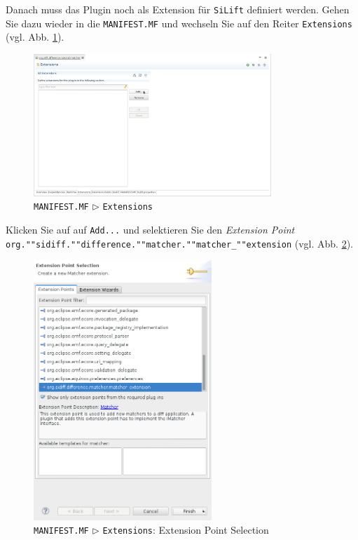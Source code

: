 Danach muss das Plugin noch als Extension für \texttt{SiLift} definiert werden.
Gehen Sie dazu wieder in die \texttt{MANIFEST.MF} und wechseln Sie auf den Reiter \texttt{Extensions} (vgl. Abb. \ref{silift-plugin_matcher_manifest_extensions}).

\begin{figure}[H]
\centering
\includegraphics[width=0.8\textwidth]{matching/graphics/silift-plugin_matcher_manifest_extensions.png}
\caption{\texttt{MANIFEST.MF} $\triangleright$ \texttt{Extensions}}
\label{silift-plugin_matcher_manifest_extensions}
\end{figure}

Klicken Sie auf auf \texttt{Add...} und selektieren Sie den \textit{Extension Point} \texttt{org.""sidiff.""difference.""matcher.""matcher\_""extension} (vgl. Abb. \ref{silift-plugin_matcher_manifest_add_extension_point}).

\begin{figure}[H]
\centering
\includegraphics[width=0.6\textwidth]{matching/graphics/silift-plugin_matcher_manifest_add_extension_point.png}
\caption{\texttt{MANIFEST.MF} $\triangleright$ \texttt{Extensions}: Extension Point Selection}
\label{silift-plugin_matcher_manifest_add_extension_point}
\end{figure}


